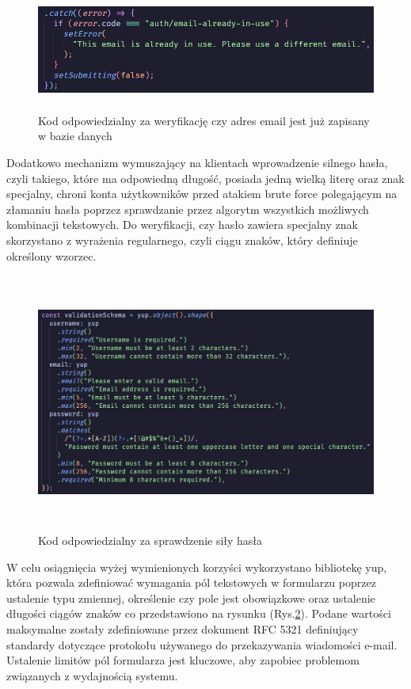 \begin{figure}[ht]
	\centering
	\vspace{0.25cm}
	\includegraphics[height=4cm]{images/bezpieczenstwo/auth_email}
	\caption{Kod odpowiedzialny za weryfikację czy adres email jest już zapisany w bazie danych}
	\label{fig:Auth}
\end{figure}

Dodatkowo mechanizm wymuszający na klientach wprowadzenie silnego hasła, czyli takiego, które ma odpowiedną długość, posiada jedną wielką literę oraz znak specjalny, chroni konta użytkowników przed atakiem brute force polegającym na złamaniu hasła poprzez sprawdzanie przez algorytm wszystkich możliwych kombinacji tekstowych. Do weryfikacji, czy hasło zawiera specjalny znak skorzystano z wyrażenia regularnego, czyli ciągu znaków, który definiuje określony wzorzec.

\begin{figure}[ht]
	\centering
	\vspace{0.25cm}
	\includegraphics[height=8.5cm]{images/bezpieczenstwo/validationSchema}
	\caption{Kod odpowiedzialny za sprawdzenie siły hasła}
	\label{fig:Validation}
\end{figure}

W celu osiągnięcia wyżej wymienionych korzyści wykorzystano bibliotekę yup, która pozwala zdefiniować wymagania pól tekstowych w formularzu poprzez ustalenie typu zmiennej, określenie czy pole jest obowiązkowe oraz ustalenie długości ciągów znaków co przedstawiono na rysunku (Rys.\ref{fig:Validation}). Podane wartości maksymalne zostały zdefiniowane przez dokument RFC 5321 \cite{rfc} definiujący standardy dotyczące protokołu używanego do przekazywania wiadomości e-mail. Ustalenie limitów pól formularza jest kluczowe, aby zapobiec problemom związanych z wydajnością systemu.

